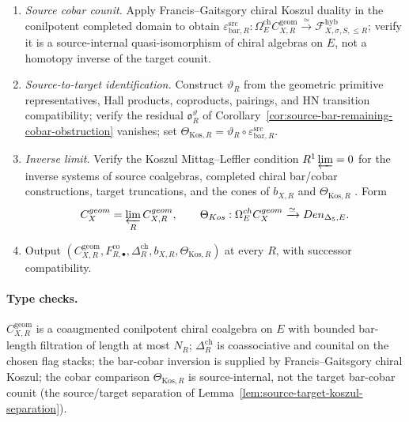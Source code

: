 \begin{enumerate}
\item \emph{Source cobar counit.}  Apply Francis--Gaitsgory chiral
Koszul duality
\cite[Theorem~6.2.2]{FrancisGaitsgoryCKD} in the conilpotent completed
domain to obtain
\(\varepsilon^{\mathrm{src}}_{\mathrm{bar},R}:
\Omega_E^{\mathrm{ch}}C_{X,R}^{\mathrm{geom}}
\xrightarrow{\simeq}
\mathcal F_{X,\sigma,S,\le R}^{\mathrm{hyb}}\); verify it is a
source-internal quasi-isomorphism of chiral algebras on \(E\), not a
homotopy inverse of the target counit.

\item \emph{Source-to-target identification.}  Construct
\(\vartheta_R\) from the geometric primitive representatives, Hall
products, coproducts, pairings, and HN transition compatibility;
verify the residual
\(\mathfrak o^\vartheta_R\) of
Corollary~\ref{cor:source-bar-remaining-cobar-obstruction} vanishes;
set \(\Theta_{\mathrm{Kos},R}=\vartheta_R\circ
\varepsilon^{\mathrm{src}}_{\mathrm{bar},R}\).

\item \emph{Inverse limit.}  Verify the Koszul Mittag--Leffler
condition \(R^1\varprojlim=0\) for the inverse systems of source
coalgebras, completed chiral bar/cobar constructions, target
truncations, and the cones of \(b_{X,R}\) and
\(\Theta_{\mathrm{Kos},R}\) \cite[\S3.5]{WeibelHA}.  Form
\[
C_X^{\mathrm{geom}}
=\varprojlim_R C_{X,R}^{\mathrm{geom}},\qquad
\Theta_{\mathrm{Kos}}:
\Omega_E^{\mathrm{ch}}C_X^{\mathrm{geom}}
\xrightarrow{\simeq}\mathsf{Den}_{\Delta_5,E}.
\]

\item Output
\((C_{X,R}^{\mathrm{geom}},F^{\mathrm{co}}_{R,\bullet},
\Delta_R^{\mathrm{ch}},b_{X,R},\Theta_{\mathrm{Kos},R})\) at every
\(R\), with successor compatibility.
\end{enumerate}

\paragraph{Type checks.}
\(C_{X,R}^{\mathrm{geom}}\) is a coaugmented conilpotent chiral
coalgebra on \(E\) with bounded bar-length filtration of length at
most \(N_R\); \(\Delta_R^{\mathrm{ch}}\) is coassociative and counital
on the chosen flag stacks; the bar-cobar inversion is supplied by
Francis--Gaitsgory chiral Koszul; the cobar comparison
\(\Theta_{\mathrm{Kos},R}\) is source-internal, not the target
bar-cobar counit (the source/target separation of
Lemma~\ref{lem:source-target-koszul-separation}).

